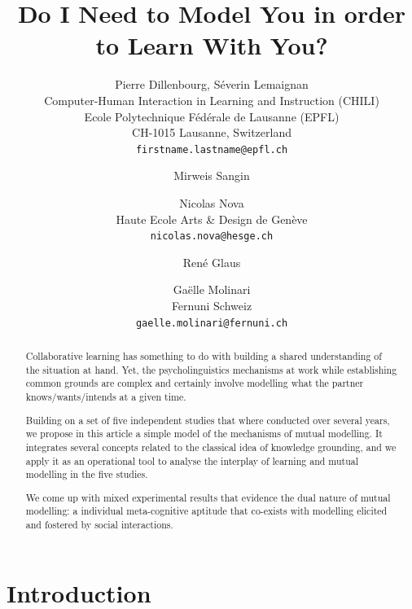 \documentclass[twocolumn]{article}
\title{Do I Need to Model You in order to Learn With You?}
\author{
    Pierre Dillenbourg, Séverin Lemaignan \\
    \small Computer-Human Interaction in Learning and Instruction (CHILI) \\
    \small Ecole Polytechnique Fédérale de Lausanne (EPFL) \\
    \small CH-1015 Lausanne, Switzerland \\
    {\tt firstname.lastname@epfl.ch}
    \and
    Mirweis Sangin \\
    \and
    Nicolas Nova \\
    \small Haute Ecole Arts \& Design de Genève\\
    {\tt nicolas.nova@hesge.ch}
    \and
    René Glaus
    \and
    Gaëlle Molinari \\
    \small Fernuni Schweiz \\
    {\tt gaelle.molinari@fernuni.ch}
}
\begin{document}
\maketitle

\begin{abstract}
    Collaborative learning has something to do with building a shared
    understanding of the situation at hand. Yet, the psycholinguistics mechanisms
    at work while establishing common grounds are complex and certainly involve
    modelling what the partner knows/wants/intends at a given time.

    Building on a set of five independent studies that where conducted over
    several years, we propose in this article a simple model of the mechanisms
    of mutual modelling. It integrates several concepts related to the classical
    idea of knowledge grounding, and we apply it as an operational tool to
    analyse the interplay of learning and mutual modelling in the five studies.

    We come up with mixed experimental results that evidence the dual nature of
    mutual modelling: a individual meta-cognitive aptitude that co-exists with
    modelling elicited and fostered by social interactions.

\end{abstract}

\section{Introduction}
\end{document}
